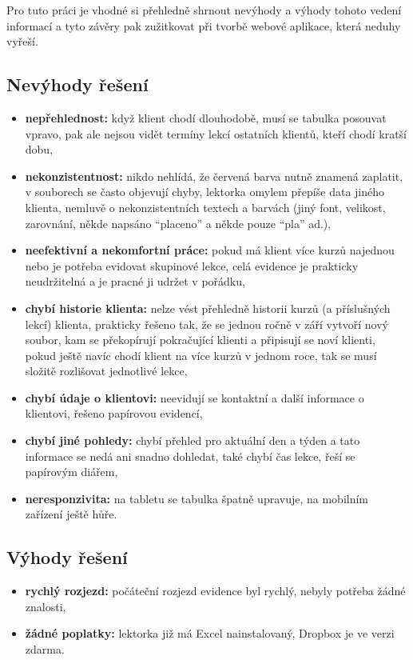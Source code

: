     Pro tuto práci je vhodné si přehledně shrnout nevýhody a výhody tohoto vedení informací a tyto závěry pak zužitkovat při tvorbě webové aplikace, která neduhy vyřeší.
    
        \subsection{Nevýhody řešení}
        \begin{itemize}
            \item \textbf{nepřehlednost:} když klient chodí dlouhodobě, musí se tabulka posouvat vpravo, pak ale nejsou vidět termíny lekcí ostatních klientů, kteří chodí kratší dobu,
            \item \textbf{nekonzistentnost:} nikdo nehlídá, že červená barva nutně znamená zaplatit, v souborech se často objevují chyby, lektorka omylem přepíše data jiného klienta, nemluvě o nekonzistentních textech a barvách (jiný font, velikost, zarovnání, někde napsáno \enquote{placeno} a někde pouze \enquote{pla} ad.),
            \item \textbf{neefektivní a nekomfortní práce:} pokud má klient více kurzů najednou nebo je potřeba evidovat skupinové lekce, celá evidence je prakticky neudržitelná a je pracné ji udržet v pořádku,
            \item \textbf{chybí historie klienta:} nelze vést přehledně historii kurzů (a příslušných lekcí) klienta, prakticky řešeno tak, že se jednou ročně v září vytvoří nový soubor, kam se překopírují pokračující klienti a připisují se noví klienti, pokud ještě navíc chodí klient na více kurzů v jednom roce, tak se musí složitě rozlišovat jednotlivé lekce,
            \item \textbf{chybí údaje o klientovi:} neevidují se kontaktní a další informace o klientovi, řešeno papírovou evidencí,
            \item \textbf{chybí jiné pohledy:} chybí přehled pro aktuální den a týden a tato informace se nedá ani snadno dohledat, také chybí čas lekce, řeší se papírovým diářem,
            \item \textbf{neresponzivita:} na tabletu se tabulka špatně upravuje, na mobilním zařízení ještě hůře.
        \end{itemize}
        
        \subsection{Výhody řešení}
        \begin{itemize}
            \item \textbf{rychlý rozjezd:} počáteční rozjezd evidence byl rychlý, nebyly potřeba žádné znalosti,
            \item \textbf{žádné poplatky:} lektorka již má Excel nainstalovaný, Dropbox je ve verzi zdarma.
        \end{itemize}
        
